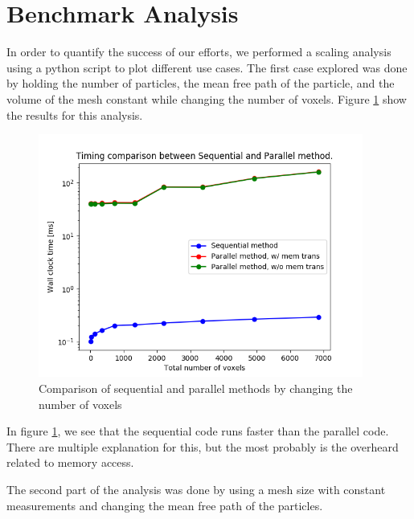 \section{Benchmark Analysis}
In order to quantify the success of our efforts, we performed a scaling analysis 
using a python script to plot different use cases.   
The first case explored was done by holding the number of particles, 
the mean free path of the particle, and the volume of the mesh constant while changing 
the number of voxels. Figure \ref{compare1} show the results for this analysis. 

\begin{figure}[H]
 \begin{centering}
 \centering
 \includegraphics[width=0.6\linewidth,height=8cm]{../figs/compare.png}
 \caption{Comparison of sequential and parallel methods by changing the number of voxels}
 \label{compare1}
 \end{centering}
\end{figure}

In figure \ref{compare1}, we see that the sequential code runs faster than the 
parallel code. There are multiple explanation for this, but the most probably is the 
overheard related to memory access.

The second part of the analysis was done by using a mesh size with constant measurements 
and changing the mean free path of the particles. 


